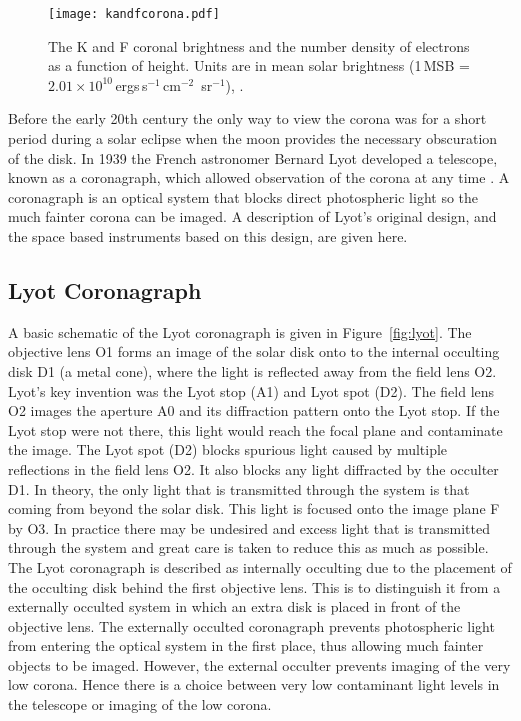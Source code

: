 \begin{figure}[!t]
\begin{center}
\texttt{[image: kandfcorona.pdf]}
\caption[Radial variation of the K and F corona]{The K and F coronal brightness and the number density of electrons as a function of height. Units are in mean solar brightness (1\,MSB = $2.01\times10^{10}$\,ergs\,s$^{-1}$\,cm$^{-2}$\, sr$^{-1}$), \citep{phillips1995}.}
\label{fig:kandf}
\end{center}
\end{figure}
Before the early 20th century the only way to view the corona was for a short period during a solar eclipse when the moon provides the necessary obscuration of the disk. In 1939 the French astronomer Bernard Lyot developed a telescope, known as a coronagraph, which allowed observation of the corona at any time \citep{lyot1939}. A coronagraph is an optical system that blocks direct photospheric light so the much fainter corona can be imaged. A description of Lyot's original design, and the space based instruments based on this design, are given here.

\subsection{Lyot Coronagraph}\label{sec:22}
A basic schematic of the Lyot coronagraph is given in Figure~\ref{fig:lyot}. The objective lens O1 forms an image of the solar disk onto
to the internal occulting disk D1 (a metal cone), where the light is reflected away from the field lens O2. Lyot's key invention was the Lyot stop (A1) and Lyot spot (D2). The field lens O2 images the aperture A0 and its diffraction pattern onto the Lyot stop. If the Lyot stop were not there, this light would reach the focal plane and contaminate the image. The Lyot spot (D2) blocks spurious light caused by multiple reflections in the field lens O2. It also blocks any light diffracted by the occulter D1. In theory, the only light that is transmitted through the system is that coming from beyond the solar disk. This light is focused onto the image plane F by O3. In practice there may be undesired and excess light that is transmitted through the system and great care is taken to reduce this as much as possible. The Lyot coronagraph is described as internally occulting due to the placement of the occulting disk behind the first objective lens. This is to distinguish it from a externally occulted system in which an extra disk is placed in front of the objective lens. The externally occulted coronagraph prevents photospheric light from entering the optical system in the first place, thus allowing much fainter objects to be imaged. However, the external occulter prevents imaging of the very low corona. Hence there is a choice between very low contaminant light levels in the telescope or imaging of the low corona. 

